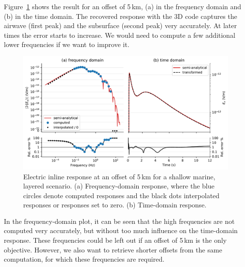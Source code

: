 \documentclass[extra, camera,%
]{gji}
\newlength{\fwidth}
\begin{document}
Figure~\ref{fig:marine} shows the result for an offset of 5\,km, (a) in the
frequency domain and (b) in the time domain. The recovered response with the 3D
code captures the airwave (first peak) and the subsurface (second peak) very
accurately. At later times the error starts to increase. We would need to
compute a few additional lower frequencies if we want to improve it.
%
\begin{figure}
  \centering
  \includegraphics[width=\fwidth]{06-marine}
  \caption{Electric inline response at an offset of 5\,km for a shallow marine,
    layered scenario. (a) Frequency-domain response, where the blue circles
    denote computed responses and the black dots interpolated responses or
    responses set to zero. (b) Time-domain response.}
  \label{fig:marine}
\end{figure}
%
In the frequency-domain plot, it can be seen that the high frequencies are not
computed very accurately, but without too much influence on the time-domain
response. These frequencies could be left out if an offset of 5\,km is the only
objective. However, we also want to retrieve shorter offsets from the same
computation, for which these frequencies are required.
\end{document}
